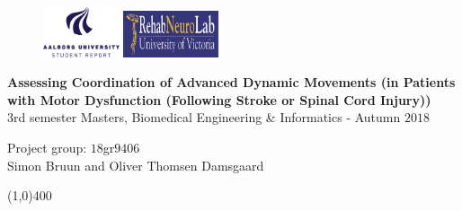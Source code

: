 \clearpage
\thispagestyle{empty}

\begin{figure}[H]
	\raggedleft
	\includegraphics[width=0.2\textwidth]{setup/aaulogo-en.png}
	\hspace{8.5cm}
	\includegraphics[width=0.25\textwidth]{setup/RNL.png}
\end{figure} 

\vspace{3 cm}

\begin{center}
	\begin{Huge}
		\textbf{Assessing Coordination of Advanced Dynamic Movements (in Patients with Motor Dysfunction (Following Stroke or Spinal Cord Injury))}\\
		\vspace{20 mm}
		3rd semester Masters, Biomedical Engineering \& Informatics - Autumn $2018$\\
		\vspace{3 mm}
	\end{Huge}
	{\Large Project group: $18$gr$9406$} \\
	\vspace{1cm}
	\large{Simon Bruun and Oliver Thomsen Damsgaard}
\end{center}
\vspace*{\fill}

\begin{center}
	\line(1,0){400}
\end{center}

